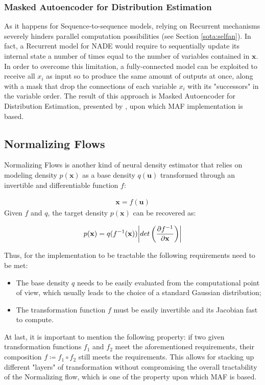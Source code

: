             \subsubsection{Masked Autoencoder for Distribution Estimation}
                As it happens for Sequence-to-sequence models, relying on Recurrent mechanisms severely hinders parallel computation possibilities (see Section \ref{sota:selfan}). In fact, a Recurrent model for NADE would require to sequentially update its internal state a number of times equal to the number of variables contained in $\mathbf{x}$. In order to overcome this limitation, a fully-connected model can be exploited to receive all $x_i$ as input so to produce the same amount of outputs at once, along with a mask that drop the connections of each variable $x_i$ with its "successors" in the variable order. The result of this approach is Masked Autoencoder for Distribution Estimation, presented by , upon which MAF implementation is based.
                
        \subsection{Normalizing Flows}
        \label{subs:norm_flows}
            Normalizing Flows is another kind of neural density estimator that relies on modeling density $p(\mathbf{x})$ as a base density $q(\mathbf{u})$ transformed through an invertible and differentiable function $f$:
            
            \begin{align}
                \mathbf{x} = f \left( \mathbf{u} \right) \label{eq:normflow}
            \end{align}
            Given $f$ and $q$, the target density $p(\mathbf{x})$ can be recovered as:
            
            \[ p(\mathbf{x}) = q(f^{-1}(\mathbf{x})) \abs*{ det \left( \frac{\partial f^{-1}}{\partial \mathbf{x}} \right) } \]
            
            Thus, for the implementation to be tractable the following requirements need to be met:
            \begin{itemize}
                \setlength\itemsep{0.05em}
                \item The base density $q$ needs to be easily evaluated from the computational point of view, which usually leads to the choice of a standard Gaussian distribution;
                \item The transformation function $f$ must be easily invertible and its Jacobian fast to compute.
            \end{itemize}
            At last, it is important to mention the following property: if two given  transformation functions $f_1$ and $f_2$ meet the aforementioned requirements, their composition $f \coloneqq f_1 \circ f_2$ still meets the requirements. This allows for stacking up different "layers" of transformation without compromising the overall tractability of the Normalizing flow, which is one of the property upon which MAF is based.
            
